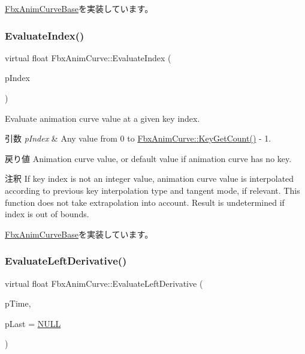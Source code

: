 \hyperlink{class_fbx_anim_curve_base_a6d31c045a3733067fc7b4e6416d2fe06}{Fbx\+Anim\+Curve\+Base}を実装しています。

\mbox{\label{class_fbx_anim_curve_ad26cbb4cd0360aa8697a2601f8540a21}} 
\subsubsection{\texorpdfstring{Evaluate\+Index()}{EvaluateIndex()}}
{\footnotesize\ttfamily virtual float Fbx\+Anim\+Curve\+::\+Evaluate\+Index (\begin{DoxyParamCaption}\item[{double}]{p\+Index }\end{DoxyParamCaption})\hspace{0.3cm}{\ttfamily [pure virtual]}}

Evaluate animation curve value at a given key index. 
\begin{DoxyParams}{引数}
{\em p\+Index} & Any value from 0 to \hyperlink{class_fbx_anim_curve_a08de74d6ef6469be37abd1df0836eac9}{Fbx\+Anim\+Curve\+::\+Key\+Get\+Count()} -\/ 1. \\
\hline
\end{DoxyParams}
\begin{DoxyReturn}{戻り値}
Animation curve value, or default value if animation curve has no key.
\end{DoxyReturn}
\begin{DoxyRemark}{注釈}
If key index is not an integer value, animation curve value is interpolated according to previous key interpolation type and tangent mode, if relevant. This function does not take extrapolation into account. Result is undetermined if index is out of bounds. 
\end{DoxyRemark}


\hyperlink{class_fbx_anim_curve_base_aa54f5c0c77e553be03ba888448dc1818}{Fbx\+Anim\+Curve\+Base}を実装しています。

\mbox{\label{class_fbx_anim_curve_a31c932aa6ca57749591a70f86498be5f}} 
\subsubsection{\texorpdfstring{Evaluate\+Left\+Derivative()}{EvaluateLeftDerivative()}}
{\footnotesize\ttfamily virtual float Fbx\+Anim\+Curve\+::\+Evaluate\+Left\+Derivative (\begin{DoxyParamCaption}\item[{\hyperlink{class_fbx_time}{Fbx\+Time}}]{p\+Time,  }\item[{int $\ast$}]{p\+Last = {\ttfamily \hyperlink{fbxarch_8h_a070d2ce7b6bb7e5c05602aa8c308d0c4}{N\+U\+LL}} }\end{DoxyParamCaption})\hspace{0.3cm}{\ttfamily [pure virtual]}}

